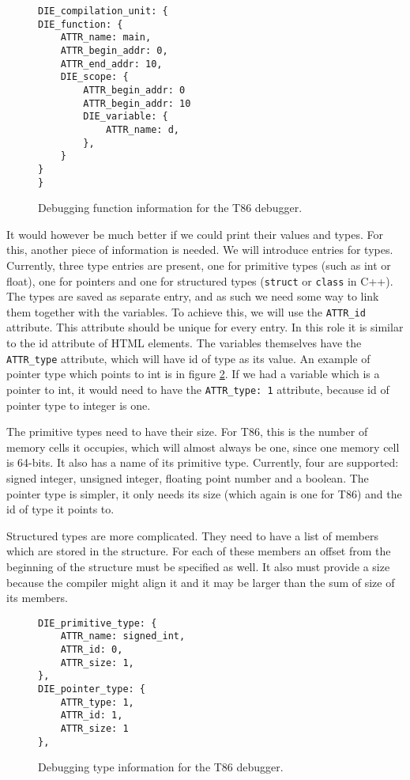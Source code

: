 \begin{figure}
    \begin{lstlisting}
DIE_compilation_unit: {
DIE_function: {
    ATTR_name: main,
    ATTR_begin_addr: 0,
    ATTR_end_addr: 10,
    DIE_scope: {
        ATTR_begin_addr: 0
        ATTR_begin_addr: 10
        DIE_variable: {
            ATTR_name: d,
        },
    }
}
}
    \end{lstlisting}
    \caption{Debugging function information for the T86 debugger.}
    \label{fig:t86dbg-die}
\end{figure}

It would however be much better if we could print their values and types. For
this, another piece of information is needed. We will introduce entries for
types. Currently, three type entries are present, one for primitive types (such
as int or float), one for pointers and one for structured types
(\texttt{struct} or \texttt{class} in C++). The types are saved as separate
entry, and as such we need some way to link them together with the variables.
To achieve this, we will use the \texttt{ATTR\_id} attribute. This attribute
should be unique for every entry. In this role it is similar to the id
attribute of HTML elements. The variables themselves have the \texttt{ATTR\_type}
attribute, which will have id of type as its value. An example of pointer type
which points to int is in figure \ref{fig:t86dbg-types}. If we had a variable
which is a pointer to int, it would need to have the \texttt{ATTR\_type: 1}
attribute, because id of pointer type to integer is one.

The primitive types need to have their size. For T86, this is the number of
memory cells it occupies, which will almost always be one, since one memory
cell is 64-bits. It also has a name of its primitive type. Currently, four are
supported: signed integer, unsigned integer, floating point number and a
boolean. The pointer type is simpler, it only needs its size (which again
is one for T86) and the id of type it points to.

Structured types are more complicated. They need to have a list of members
which are stored in the structure. For each of these members an offset
from the beginning of the structure must be specified as well. It also must
provide a size because the compiler might align it and it may be larger
than the sum of size of its members.

\begin{figure}
    \begin{lstlisting}
DIE_primitive_type: {
    ATTR_name: signed_int,
    ATTR_id: 0,
    ATTR_size: 1,
},
DIE_pointer_type: {
    ATTR_type: 1,
    ATTR_id: 1,
    ATTR_size: 1
},
    \end{lstlisting}
    \caption{Debugging type information for the T86 debugger.}
    \label{fig:t86dbg-types}
\end{figure}

